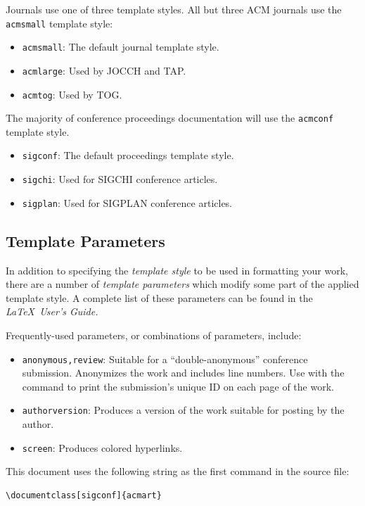 Journals use one of three template styles. All but three ACM journals
use the {\verb|acmsmall|} template style:
\begin{itemize}
\item {\texttt{acmsmall}}: The default journal template style.
\item {\texttt{acmlarge}}: Used by JOCCH and TAP.
\item {\texttt{acmtog}}: Used by TOG.
\end{itemize}

The majority of conference proceedings documentation will use the {\verb|acmconf|} template style.
\begin{itemize}
\item {\texttt{sigconf}}: The default proceedings template style.
\item{\texttt{sigchi}}: Used for SIGCHI conference articles.
\item{\texttt{sigplan}}: Used for SIGPLAN conference articles.
\end{itemize}

\subsection{Template Parameters}

In addition to specifying the {\itshape template style} to be used in
formatting your work, there are a number of {\itshape template parameters}
which modify some part of the applied template style. A complete list
of these parameters can be found in the {\itshape \LaTeX\ User's Guide.}

Frequently-used parameters, or combinations of parameters, include:
\begin{itemize}
\item {\texttt{anonymous,review}}: Suitable for a ``double-anonymous''
  conference submission. Anonymizes the work and includes line
  numbers. Use with the \texttt{\string\acmSubmissionID} command to print the
  submission's unique ID on each page of the work.
\item{\texttt{authorversion}}: Produces a version of the work suitable
  for posting by the author.
\item{\texttt{screen}}: Produces colored hyperlinks.
\end{itemize}

This document uses the following string as the first command in the
source file:
\begin{verbatim}
\documentclass[sigconf]{acmart}
\end{verbatim}

